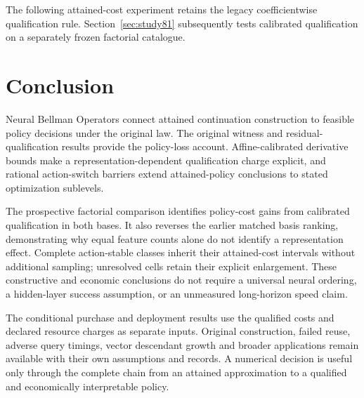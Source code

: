 \documentclass[ecta,nameyear,draft]{econsocart}
\begin{document}






\noindent The following attained-cost experiment retains the legacy coefficientwise qualification rule. Section~\ref{sec:study81} subsequently tests calibrated qualification on a separately frozen factorial catalogue.



\section{Conclusion}\label{sec:conclusion65}
Neural Bellman Operators connect attained continuation construction to feasible policy decisions under the original law. The original witness and residual-qualification results provide the policy-loss account. Affine-calibrated derivative bounds make a representation-dependent qualification charge explicit, and rational action-switch barriers extend attained-policy conclusions to stated optimization sublevels.

The prospective factorial comparison identifies policy-cost gains from calibrated qualification in both bases. It also reverses the earlier matched basis ranking, demonstrating why equal feature counts alone do not identify a representation effect. Complete action-stable classes inherit their attained-cost intervals without additional sampling; unresolved cells retain their explicit enlargement. These constructive and economic conclusions do not require a universal neural ordering, a hidden-layer success assumption, or an unmeasured long-horizon speed claim.

The conditional purchase and deployment results use the qualified costs and declared resource charges as separate inputs. Original construction, failed reuse, adverse query timings, vector descendant growth and broader applications remain available with their own assumptions and records. A numerical decision is useful only through the complete chain from an attained approximation to a qualified and economically interpretable policy.



\end{document}
